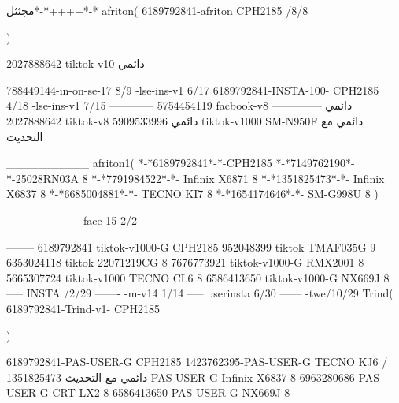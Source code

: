 مجثثل*-*++++*-*
afriton(
6189792841-afriton CPH2185  /8/8

)

2027888642 tiktok-v10
دائمي

788449144-in-on-se-17 8/9
-lse-ins-v1 6/17
6189792841-INSTA-100- CPH2185 4/18
-lse-ins-v1 7/15
------------
5754454119 facbook-v8
دائمي
--------------
2027888642 tiktok-v8
دائمي
5909533996 tiktok-v1000  SM-N950F
دائمي مع التحديث

__________
afriton1(
*-*6189792841*-*-CPH2185
*-*7149762190*-*-25028RN03A  8
*-*7791984522*-*- Infinix X6871  8
*-*1351825473*-*-  Infinix X6837   8
*-*6685004881*-*- TECNO KI7   8
*-*1654174646*-*- SM-G998U   8
)


------
------------
-face-15 2/2

--------
6189792841 tiktok-v1000-G CPH2185 
952048399 tiktok TMAF035G 9
6353024118 tiktok 22071219CG 8
7676773921 tiktok-v1000-G RMX2001  8
5665307724 tiktok-v1000 TECNO CL6  8
6586413650 tiktok-v1000-G NX669J  8
-----
 INSTA /2/29
-------
-m-v14 1/14
-----
userinsta 6/30
------
-twe/10/29
Trind(
6189792841-Trind-v1- CPH2185 

)


6189792841-PAS-USER-G CPH2185 
1423762395-PAS-USER-G TECNO KJ6  /دائمي مع التحديث
1351825473-PAS-USER-G  Infinix X6837  8
6963280686-PAS-USER-G  CRT-LX2  8
6586413650-PAS-USER-G  NX669J  8
    ---------------
